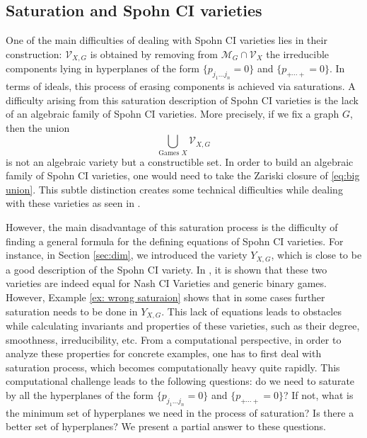 \documentclass[11pt]{amsart}
\numberwithin{equation}{section}
\theoremstyle{plain}
\numberwithin{theorem}{section}
\theoremstyle{definition}
\begin{document}
\subsection{Saturation and Spohn CI varieties}\label{sec:saturation}

 One of the main difficulties of dealing with Spohn CI varieties lies in their construction: $\mathcal{V}_{X,G}$ is obtained by removing from $\mathcal{M}_G\cap\mathcal{V}_X$ the irreducible components lying in hyperplanes of the form  $\{p_{j_1\ldots j_n}=0\} $ and $\{p_{+\cdots+}=0\}$. In terms of ideals, this process of erasing components is achieved via saturations. 
 A difficulty arising from this saturation description of Spohn CI varieties is the lack of an algebraic family of Spohn CI varieties. More precisely, if we fix a graph $G$, then the union
 \begin{equation}\label{eq:big union}
\bigcup_{\text{Games } X} \mathcal{V}_{X,G}
 \end{equation}
is not an algebraic variety but a constructible set. In order to build an algebraic family of Spohn CI varieties, one would need to take the Zariski closure of \eqref{eq:big union}. This subtle distinction creates some technical difficulties while dealing with these varieties as seen in \cite[Proposition 25]{portakal2024game}.

 
 However, the main disadvantage of this saturation process is the difficulty of finding a general formula for the defining equations of Spohn CI varieties. For instance, in Section \ref{sec:dim}, we introduced the variety $Y_{X,G}$, which is close to be a good description of the Spohn CI variety. 
 In \cite[Proposition 25]{portakal2024game}, it is shown that these two varieties are indeed equal for Nash CI Varieties and generic binary games.
 However, Example \ref{ex: wrong saturaion} shows that in some cases further saturation needs to be done in $Y_{X,G}$. This lack of equations leads to obstacles while calculating invariants and properties of these varieties, such as their degree, smoothness, irreducibility, etc. From a computational perspective, in order to analyze these properties for concrete examples, one has to first deal with saturation process, which becomes computationally heavy quite rapidly. This computational challenge leads to the following questions: do we need to saturate by all the hyperplanes of the form $\{p_{j_1\ldots j_n}=0\} $ and $\{p_{+\cdots+}=0\}$?  If not, what is the minimum set of hyperplanes we need in the process of saturation? Is there a better set of hyperplanes? We present a partial answer to these questions.
\end{document}

